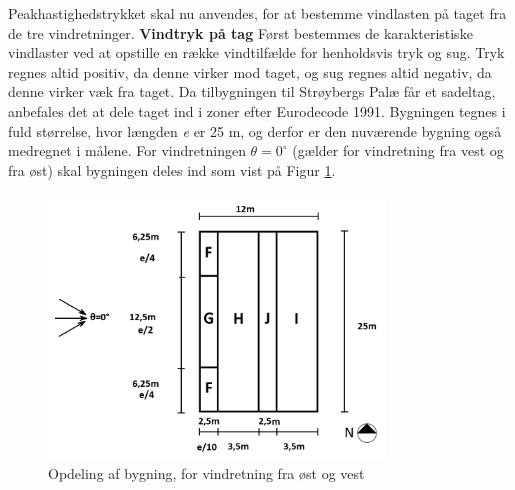 Peakhastighedstrykket skal nu anvendes, for at bestemme vindlasten på taget fra de tre vindretninger.
\newline
\newline
\textbf{Vindtryk på tag}
\newline
Først bestemmes de karakteristiske vindlaster ved at opstille en række vindtilfælde for henholdsvis tryk og sug. Tryk regnes altid positiv, da denne virker mod taget, og sug regnes altid negativ, da denne virker væk fra taget.
\newline
\newline
Da tilbygningen til Strøybergs Palæ får et sadeltag, anbefales det at dele taget ind i zoner efter Eurodecode 1991. Bygningen tegnes i fuld størrelse, hvor længden \textit{e} er 25 m, og derfor er den nuværende bygning også medregnet i målene. For vindretningen $\theta = 0^{\circ}$ (gælder for vindretning fra vest og fra øst) skal bygningen deles ind som vist på Figur \ref{fig:opdeling}.  

\begin{figure}[htbp]
	\centering
	\includegraphics[width=0.8\textwidth]{billeder/opdeling.png}
	\caption{Opdeling af bygning, for vindretning fra øst og vest \citep[ kapitel 7.2.5]{EU91}}
	\label{fig:opdeling}
\end{figure}

